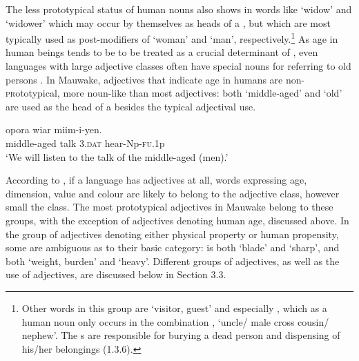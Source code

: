 The less prototypical status of human nouns also shows in words like  `widow' and  `widower' which may occur by themselves as heads of a , but which are most typically used as post-modifiers of  `woman' and  `man', respectively.\footnote{Other words in this group are \textbf{\textit{} }`visitor, guest' and especially , which as a human noun only occurs in the combination , `uncle/ male cross cousin/ nephew'. The s are responsible for burying a dead person and dispensing of his/her belongings (1.3.6).} As age in human beings tends to be to be treated as a crucial determinant of , even languages with large adjective classes often have special nouns for referring to old persons \citep[368]{Wierzbicka1986}. In Mauwake, adjectives that indicate age in humans are non-\textsc{pr}ototypical, more noun-like than most adjectives: both  `middle-aged' and  `old' are used as the head of a  besides the typical adjectival use.

\ea%
\label{ex:x25}
\gll {} opora wiar miim-i-yen. \\
middle-aged talk 3.\textsc{dat} hear-Np-\textsc{fu}.1p\\
\glt`We will listen to the talk of the middle-aged (men).'
\z

According to \citet[56]{Dixon1977}, if a language has adjectives at all, words expressing age, dimension, value and colour are likely to belong to the adjective class, however small the class. The most prototypical adjectives in Mauwake belong to these groups, with the exception of adjectives denoting human age, discussed above. In the group of adjectives denoting either physical property or human propensity, some are ambiguous as to their basic category:  is both `blade' and `sharp', and  both `weight, burden' and `heavy'. Different groups of adjectives, as well as the use of adjectives, are discussed below in Section 3.3.

